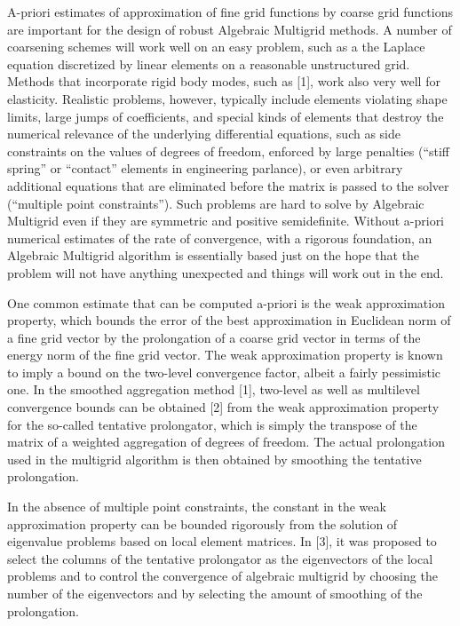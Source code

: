 \documentclass[11pt]{article}
\begin{document}
A-priori estimates of approximation of fine grid functions by
coarse grid functions are important for the design of robust
Algebraic Multigrid methods. A number of coarsening schemes will
work well on an easy problem, such as a the Laplace equation
discretized by linear elements on a reasonable unstructured
grid. Methods that incorporate rigid body modes, such as [1],
work also very well for elasticity. Realistic problems, however,
typically include elements violating shape limits, large jumps
of coefficients,  and special kinds of elements that destroy the
numerical relevance of  the underlying differential equations,
such as side constraints on the values of degrees of freedom,
enforced by large penalties (``stiff spring'' or ``contact''
elements in engineering parlance), or even arbitrary additional
equations that are eliminated before the matrix is passed to the
solver (``multiple point constraints''). Such problems are hard to
solve by Algebraic Multigrid even if they are symmetric and
positive semidefinite.  Without a-priori numerical estimates of
the rate of convergence, with  a rigorous foundation, an
Algebraic Multigrid algorithm is essentially based just on the
hope that the problem will not have anything unexpected and
things will work out in the end.

One common estimate that can be computed a-priori is the weak
approximation property, which bounds the error of the best
approximation in Euclidean norm of a fine grid vector by the
prolongation of a coarse grid vector in terms of the energy norm
of the fine grid vector. The weak approximation property is
known to imply a bound on the two-level convergence factor,
albeit a fairly pessimistic one. In the smoothed aggregation
method [1], two-level as well as multilevel convergence bounds
can be obtained [2] from the weak approximation property for the
so-called tentative prolongator, which is simply the transpose
of the matrix of a weighted aggregation of degrees of freedom.
The actual prolongation used in the multigrid algorithm is then
obtained by smoothing the tentative prolongation.


In the absence of multiple point constraints, the constant in
the weak approximation property can be bounded rigorously from
the solution of eigenvalue problems based on local element
matrices.  In [3], it was proposed to select the columns of the
tentative prolongator as the eigenvectors of the local problems
and to control the convergence of algebraic multigrid by
choosing the number of the eigenvectors and by selecting the
amount of smoothing of the prolongation.
\end{document}
